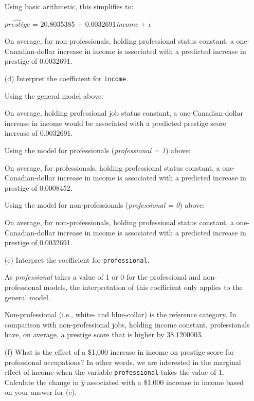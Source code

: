 \documentclass[12pt,letterpaper]{article}
\begin{document}
\begin{enumerate}
	Using basic arithmetic, this simplifies to:
	
	$\hat{prestige}$ = 20.8035385 + 0.0032691\textit{income} + $\epsilon$
	
		On average, for non-professionals, holding professional status constant, a one-Canadian-dollar increase in income is associated with a predicted increase in prestige of 0.0032691.

	
\newpage
	\item [(d)]
	Interpret the coefficient for \texttt{income}. \vspace{.5cm}
	
	Using the general model above:
	
	On average, holding professional job status constant, a one-Canadian-dollar increase in income would be associated with a predicted prestige score increase of 0.0032691.  \vspace{.5cm}
	
	Using the model for professionals (\textit{professional = 1}) above:
	
	On average, for professionals, holding professional status constant, a one-Canadian-dollar increase in income is associated with a predicted increase in prestige of 0.0008452. \vspace{.5cm}
	
	Using the model for non-professionals (\textit{professional = 0}) above:
	
	On average, for non-professionals, holding professional status constant, a one-Canadian-dollar increase in income is associated with a predicted increase in prestige of 0.0032691.
	
	\vspace{5cm}	
	\item [(e)]
	Interpret the coefficient for \texttt{professional}. \vspace{.5cm}
	
	As \textit{professional} takes a value of 1 or 0 for the professional and non-professional models, the interpretation of this coefficient only applies to the general model. 
	
	Non-professional (i.e., white- and blue-collar) is the reference category. In comparison with non-professional jobs, holding income constant, professionals have, on average, a prestige score that is higher by 38.1200003. 
	
	\newpage
	\item [(f)]
	What is the effect of a \$1,000 increase in income on prestige score for professional occupations? In other words, we are interested in the marginal effect of income when the variable \texttt{professional} takes the value of $1$. Calculate the change in $\hat{y}$ associated with a \$1,000 increase in income based on your answer for (c). \vspace{.5cm}	
	

\end{enumerate}
\end{document}
